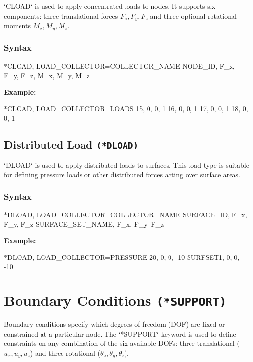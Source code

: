 `CLOAD` is used to apply concentrated loads to nodes. It supports six components: three translational forces \( F_x, F_y, F_z \) and three optional rotational moments \( M_x, M_y, M_z \).

\subsubsection{Syntax}

\begin{codeBlock}
*CLOAD, LOAD_COLLECTOR=COLLECTOR_NAME
NODE_ID, F_x, F_y, F_z, M_x, M_y, M_z
\end{codeBlock}

\textbf{Example:}

\begin{codeBlock}
*CLOAD, LOAD_COLLECTOR=LOADS
15, 0, 0, 1
16, 0, 0, 1
17, 0, 0, 1
18, 0, 0, 1
\end{codeBlock}

\subsection{Distributed Load \texttt{(*DLOAD)}}

`DLOAD` is used to apply distributed loads to surfaces. This load type is suitable for defining pressure loads or other distributed forces acting over surface areas.

\subsubsection{Syntax}

\begin{codeBlock}
*DLOAD, LOAD_COLLECTOR=COLLECTOR_NAME
SURFACE_ID, F_x, F_y, F_z
SURFACE_SET_NAME, F_x, F_y, F_z
\end{codeBlock}

\textbf{Example:}
\begin{codeBlock}
*DLOAD, LOAD_COLLECTOR=PRESSURE
20, 0, 0, -10
SURFSET1, 0, 0, -10
\end{codeBlock}

\section{Boundary Conditions \texttt{(*SUPPORT)}}

Boundary conditions specify which degrees of freedom (DOF) are fixed or constrained at a particular node. The `*SUPPORT` keyword is used to define constraints on any combination of the six available DOFs: three translational (\( u_x, u_y, u_z \)) and three rotational (\( \theta_x, \theta_y, \theta_z \)).

